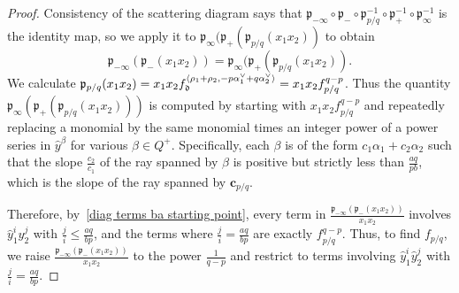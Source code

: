 \documentclass[ALCO,ThmDefs,Unicode,epreuves]{cedram}
\newcommand{\br}[1]{{\langle #1 \rangle}}
\newcommand{\p}{{\mathfrak p}}
\newcommand{\ck}{\spcheck}
\newcommand{\cc}{\mathbf{c}}
\renewcommand{\d}{{\mathfrak d}}
\newcommand{\hy}{\hat{y}}
\begin{document}
\begin{proof}
Consistency of the scattering diagram says that ${\p_{-\infty}\circ\p_-\circ\p_{p/q}^{-1}\circ\p_+^{-1}\circ\p_\infty^{-1}}$ is the identity map, so we apply it to $\p_\infty(\p_+(\p_{p/q}(x_1x_2))$ to obtain
\begin{equation}\label{diag terms ba starting point}
\p_{-\infty}(\p_-(x_1x_2))=\p_\infty(\p_+(\p_{p/q}(x_1x_2)).
\end{equation}
We calculate $\p_{p/q}(x_1x_2)=x_1x_2 f_\d^{\br{\rho_1+\rho_2,-p\alpha_1\ck+q\alpha_2\ck}}=x_1x_2f_{p/q}^{q-p}$.
Thus the quantity $\p_\infty(\p_+(\p_{p/q}(x_1x_2)))$ is computed by starting with $x_1x_2f_{p/q}^{q-p}$ and repeatedly replacing a monomial by the same monomial times an integer power of a power series in $\hy^\beta$ for various $\beta\in Q^+$.
Specifically, each $\beta$ is of the form $c_1\alpha_1+c_2\alpha_2$ such that the slope $\frac{c_2}{c_1}$ of the ray spanned by $\beta$ is positive but strictly less than $\frac{aq}{pb}$, which is the slope of the ray spanned by $\cc_{p/q}$.

Therefore, by~\eqref{diag terms ba starting point}, every term in $\frac{\p_{-\infty}(\p_-(x_1x_2))}{x_1x_2}$ involves $\hy_1^i\hy_2^j$ with $\frac ji\le\frac{aq}{bp}$, and the terms where $\frac ji=\frac{aq}{bp}$ are exactly $f_{p/q}^{q-p}$.
Thus, to find $f_{p/q}$, we raise $\frac{\p_{-\infty}(\p_-(x_1x_2))}{x_1x_2}$ to the power $\frac1{q-p}$ and restrict to terms involving $\hy_1^i\hy_2^j$ with $\frac ji=\frac{aq}{bp}$.
\end{proof}
\end{document}
